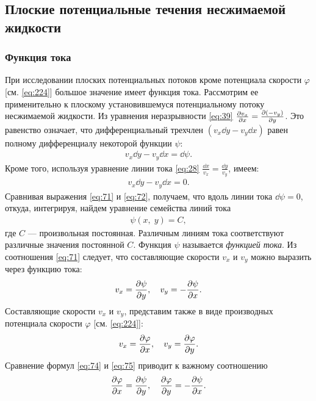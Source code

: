 	\subsection{Плоские потенциальные течения несжимаемой жидкости}
	
	\subsubsection{Функция тока}
	При исследовании плоских потенциальных потоков кроме потенциала скорости $\varphi$ [см. \eqref{eq:224}] большое значение имеет функция тока. Рассмотрим ее применительно к плоскому установившемуся потенциальному потоку несжимаемой жидкости.\n
	Из уравнения неразрывности \eqref{eq:39} $\frac{\partial v_x}{\partial x} = \frac{\partial\left(-v_y\right)}{\partial y}$. Это равенство означает, что дифференциальный трехчлен $\left(v_x\dd y - v_y\dd x\right)$ равен полному дифференциалу некоторой функции $\psi$:
	\begin{gather}
		v_x\dd y - v_y\dd x = \dd\psi.\label{eq:71}
	\end{gather}\n
	Кроме того, используя уравнение линии тока \eqref{eq:28} $\frac{\dd x}{v_x} = \frac{\dd y}{v_y}$, имеем:
	\begin{gather}
		v_x\dd y - v_y\dd x = 0.\label{eq:72}
	\end{gather}\n
	Сравнивая выражения \eqref{eq:71} и \eqref{eq:72}, получаем, что вдоль линии тока $\dd\psi = 0$, откуда, интегрируя, найдем уравнение семейства линий тока
	\begin{gather}
		\psi\left(x,\; y\right) = C,\label{eq:73}
	\end{gather}
	где $C$ --- произвольная постоянная.\n
	Различным линиям тока соответствуют различные значения постоянной $C$. Функция $\psi$ называется \textit{функцией тока}.\n
	Из соотношения \eqref{eq:71} следует, что составляющие скорости $v_x$ и $v_y$ можно выразить через функцию тока:
	\begin{gather}
		v_x = \frac{\partial\psi}{\partial y}, \quad v_y = -\frac{\partial\psi}{\partial x}.\label{eq:74}
	\end{gather}\n
	Составляющие скорости $v_x$ и $v_y$, представим также в виде производных потенциала скорости $\varphi$ [см. \eqref{eq:224}]:
	\begin{gather}
		v_x = \frac{\partial\varphi}{\partial x}, \quad v_y = \frac{\partial\varphi}{\partial y}.\label{eq:75}
	\end{gather}\n
	Сравнение формул \eqref{eq:74} и \eqref{eq:75} приводит к важному соотношению
	\begin{gather}
		\frac{\partial\varphi}{\partial x} = \frac{\partial\psi}{\partial y}, \quad \frac{\partial\varphi}{\partial y} = -\frac{\partial\psi}{\partial x}.\label{eq:76}
	\end{gather}\n
